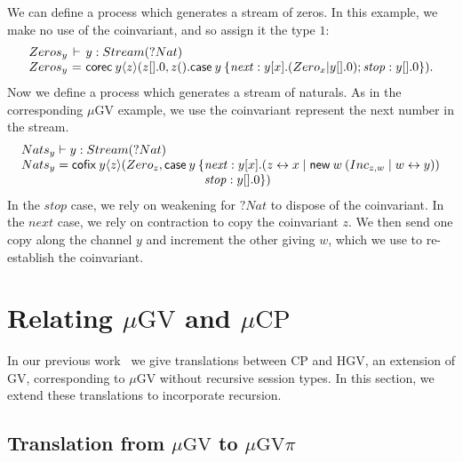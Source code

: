\documentclass[orivec,envcountsame]{llncs}
\makeatletter
\newcommand{\cpquery}[1]{{? #1}}
\newcommand{\mkwd}[1]{\mathsf{#1}}
\newcommand{\link}[2]{#1 \leftrightarrow #2}
\newcommand{\cut}[4]{\mkwd{new}\:#1 \: (#3 \mid #4)}
\newcommand{\corec}[5]{\mkwd{corec}\:#1 \langle #2 \rangle (#4,#5)}
\newcommand{\clabel}[1]{\mathit{#1}}
\renewcommand{\case}[2]{\mkwd{case}\:#1\:\{#2\}}
\newcommand{\lrkwd}{\mkwd{cofix}}
\newcommand{\key}{\mkwd}
\newcommand{\mucp}{$\mu\mathrm{CP}$\xspace}
\newcommand{\mugv}{$\mu\mathrm{GV}$\xspace}
\newcommand{\gvpi}{$\mu\mathrm{GV}\pi$\xspace}
\newcommand{\ba}{\begin{array}}
\newcommand{\ea}{\end{array}}
\newcommand{\bl}{\ba[t]{@{}l@{}}}
\newcommand{\el}{\ea}
\newenvironment{eqs}{\ba{@{}r@{~}c@{~}l@{}}}{\ea}
\makeatother
\begin{document}
We can define a process which generates a stream of zeros. In this example, we make no use of the
coinvariant, and so assign it the type $1$:
\small\[\begin{eqs}
  Zeros_y &\vdash& y:Stream(\cpquery{Nat}) \\
  Zeros_y &=& \corec{y}{z}{1}{z[].0}{z().\case{y}{\clabel{next}: y[x].(Zero_x | y[].0); \clabel{stop}: y[].0}}.
\end{eqs}\]\normalsize
Now we define a process which generates a stream of naturals. As in the corresponding \mugv example,
we use the coinvariant represent the next number in the stream.
%
\small\[
\bl
  Nats_y \vdash y:Stream(\cpquery{Nat}) \\
  Nats_y = \lrkwd \: y \langle z \rangle (Zero_z,
    \key{case}\:y \:\{
       \bl
       \clabel{next}: y[x].(\link{z}{x} \mid \cut{w}{}{Inc_{z,w}}{\link{w}{y}}) \\
       \clabel{stop}: y[].0\}) \\
       \el \\
\el
\]\normalsize
%
In the $\clabel{stop}$ case, we rely on weakening for $\cpquery{Nat}$ to dispose of the coinvariant.
In the $\clabel{next}$ case, we rely on contraction to copy the coinvariant $z$.  We then send one
copy along the channel $y$ and increment the other giving $w$, which we use to re-establish the
coinvariant.

\section{Relating \mugv and \mucp}\label{sec:translation}

In our previous work~\citep{LindleyM14} we give translations between CP and HGV, an extension of GV,
corresponding to \mugv without recursive session types. In this section, we extend these
translations to incorporate recursion.

\subsection{Translation from \mugv to \gvpi}\label{sec:gvtogvpi}
\end{document}
